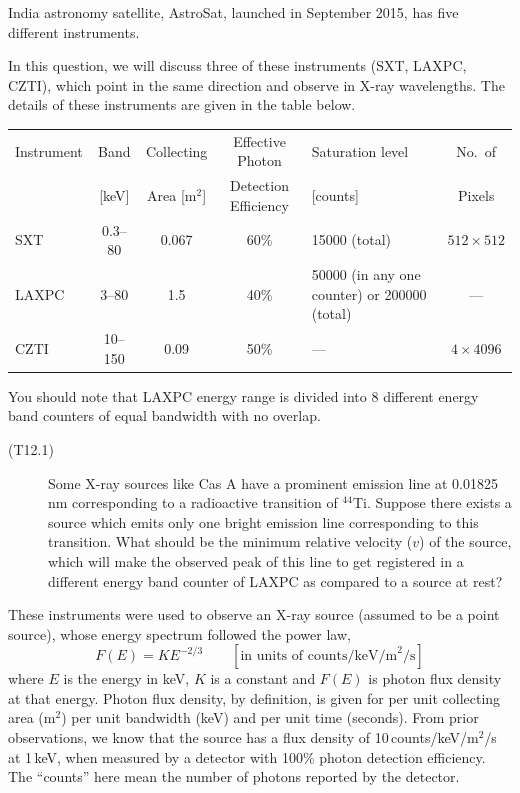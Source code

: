 India astronomy satellite, AstroSat, launched in September 2015, has five
different instruments.


In this question, we will discuss three of these instruments (SXT, LAXPC,
CZTI), which point in the same direction and observe in X-ray wavelengths. The
details of these instruments are given in the table below.

\begin{center}
\small
\begin{tabular}{|l|c|c|c|p{3.2cm}|c|}
\hline
Instrument & Band & Collecting & Effective Photon & Saturation level & No.\ of
\\
 & [keV] & Area [m$^2$] & Detection Efficiency & [counts] & Pixels \\
\hline
SXT & 0.3--80 & 0.067 & 60\% & 15000 (total) & $512 \times 512$ \\
\hline
LAXPC & 3--80 & 1.5 & 40\% & 50000 (in any one counter) or 200000 (total)
  & --- \\
\hline
CZTI & 10--150 & 0.09 & 50\% & --- & $4 \times 4096$ \\
\hline
\end{tabular}
\end{center}

You should note that LAXPC energy range is divided into 8 different energy band
counters of equal bandwidth with no overlap.

\begin{description}
\item[(T12.1)] Some X-ray sources like Cas A have a prominent emission line at
  0.01825\,nm corresponding to a radioactive transition of $^{44}$Ti. Suppose
  there exists a source which emits only one bright emission line corresponding
  to this transition. What should be the minimum relative velocity ($v$) of the
  source, which will make the observed peak of this line to get registered in a
  different energy band counter of LAXPC as compared to a source at rest?
\end{description}

These instruments were used to observe an X-ray source (assumed to be a point
source), whose energy spectrum followed the power law,
\[ F(E) = K E^{-2/3} \qquad
   [\text{in units of counts/keV/m}^2\text{/s}] \]
where $E$ is the energy in keV, $K$ is a constant and $F(E)$ is photon flux
density at that energy. Photon flux density, by definition, is given for per
unit collecting area (m$^2$) per unit bandwidth (keV) and per unit time
(seconds). From prior observations, we know that the source has a flux density
of 10\,counts/keV/m$^2$/s at 1\,keV, when measured by a detector with 100\%
photon detection efficiency. The ``counts'' here mean the number of photons
reported by the detector.

